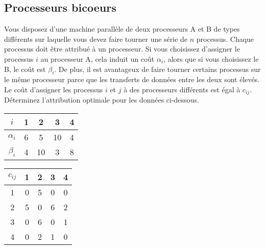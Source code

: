 \subsection{Processeurs bicoeurs}
Vous disposez d'une machine parallèle de deux processeurs A et B de types différents sur laquelle vous devez faire tourner une série de $n$ processus. Chaque processus doit être attribué à un processeur. Si vous choisissez d'assigner le processus $i$ au processeur A, cela induit un coût $\alpha_i$, alors que si vous choisissez le B, le coût est $\beta_i$. De plus, il est avantageux de faire tourner certains processus sur le même processeur parce que les transferts de données entre les deux sont élevés. Le coût d'assigner les processus $i$ et $j$ à des processeurs différents est égal à $c_{ij}$. Déterminez l'attribution optimale pour les données ci-dessous.

\begin{multicols}{2}

\begin{center}
\begin{tabular}{||c||c|c|c|c||}
\hline
$i$ & 1 & 2 & 3 & 4 \\
\hline
$\alpha_i$ & 6 & 5 & 10 & 4 \\
\hline
$\beta_i$ & 4 & 10 & 3 & 8 \\
\hline
\end{tabular}
\end{center}

\columnbreak

\begin{center}
\begin{tabular}{||c||c|c|c|c||}
\hline
$c_{ij}$ & 1 & 2 & 3 & 4 \\
\hline
1 & 0 & 5 & 0 & 0 \\
\hline
2 & 5 & 0 & 6 & 2 \\
\hline
3 & 0 & 6 & 0 & 1 \\
\hline
4 & 0 & 2 & 1 & 0 \\
\hline
\end{tabular}
\end{center}

\end{multicols}

